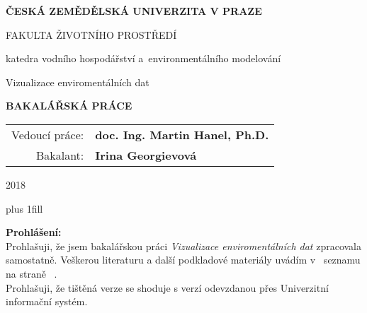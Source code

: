 \documentclass[12pt,a4paper]{report}
\begin{document}


\pagestyle{empty}
\begin{center}

\large

{ \bf ČESKÁ ZEMĚDĚLSKÁ UNIVERZITA V PRAZE}

\medskip

FAKULTA ŽIVOTNÍHO PROSTŘEDÍ

\medskip

{\sc \Large katedra vodního hospodářství a~environmentálního modelování}

\vfill

\vfill

{\LARGE Vizualizace enviromentálních dat}

\vspace{2mm}

{\bf \Large BAKALÁŘSKÁ PRÁCE}

\vspace{15mm}

\vfill

\vfill

\begin{tabular}{rl}

\noalign{\vspace{2mm}}
Vedoucí práce: & \bf doc. Ing. Martin Hanel, Ph.D. \\
\noalign{\vspace{2mm}}
Bakalant: & \bf Irina Georgievová \\
\end{tabular}

\vfill

2018

\end{center}
\newpage

\newpage


\vglue 0pt plus 1fill

\noindent
{\bfseries Prohlášení:} \\

Prohlašuji, že jsem bakalářskou práci \emph{Vizualizace enviromentálních dat} zpracovala samostatně. Veškerou literaturu a další podkladové materiály uvádím v~ seznamu na straně ~\pageref{literatura}. \\

Prohlašuji, že tištěná verze se shoduje s verzí odevzdanou přes Univerzitní informační systém.

\vspace{10mm}
\end{document}
